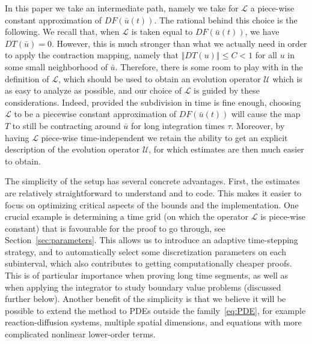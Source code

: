 \documentclass[10pt,a4paper]{article}
\theoremstyle{plain}
\newcommand{\U}{\mathcal{U}}
\renewcommand{\L}{\mathcal{L}}
\newcommand{\bu}{\bar{u}}
\newcommand{\1}{\mathbf{1}}
\begin{document}
In this paper we take an intermediate path, namely we take for $\L$ a piece-wise constant approximation of $DF(\bu(t))$. The rational behind this choice is the following. We recall that, when $\L$ is taken equal to $DF(\bu(t))$, we have $DT(\bu) = 0$. However, this is much stronger than what we actually need in order to apply the contraction mapping, namely that $\left\Vert DT(u)\right\Vert \leq C < 1$ for all $u$ in some small neighborhood of $\bu$. Therefore, there is some room to play with in the definition of $\L$, which should be used to obtain an evolution operator $\U$ which is as easy to analyze as possible, and our choice of $\L$ is guided by these considerations.
Indeed, provided the subdivision in time is fine enough, choosing $\L$ to be a piecewise constant approximation of $DF(\bu(t))$ will cause the map $T$ to still be contracting around $\bu$ for long integration times $\tau$. Moreover, by having $\L$ piece-wise time-independent we retain the ability to get an explicit description of the evolution operator $\U$, for which estimates are then much easier to obtain. 

The simplicity of the setup has several concrete advantages. First, the estimates are relatively straightforward to understand and to code. This makes it easier to focus on optimizing critical aspects of the bounds and the implementation. One crucial example is determining a time grid (on which the operator $\L$ is piece-wise constant) that is favourable for the proof to go through, see Section~\ref{sec:parameters}. This allows us to introduce an adaptive time-stepping strategy, and to automatically select some discretization parameters on each subinterval, which also contributes to getting computationally cheaper proofs. This is of particular importance when proving long time segments, as well as when applying the integrator to study boundary value problems (discussed further below). Another benefit of the simplicity is that we believe it will be possible to extend the method to PDEs outside the family~\eqref{eq:PDE}, for example reaction-diffusion systems, multiple spatial dimensions, and equations with more complicated nonlinear lower-order terms.

\medskip
\end{document}
